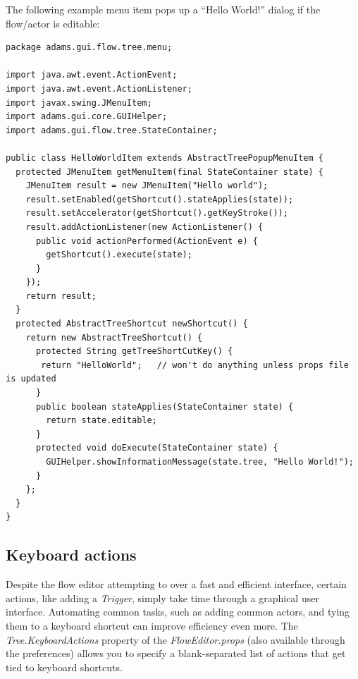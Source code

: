 The following example menu item pops up a ``Hello World!'' dialog if the
flow/actor is editable:
{\scriptsize
\begin{verbatim}
package adams.gui.flow.tree.menu;

import java.awt.event.ActionEvent;
import java.awt.event.ActionListener;
import javax.swing.JMenuItem;
import adams.gui.core.GUIHelper;
import adams.gui.flow.tree.StateContainer;

public class HelloWorldItem extends AbstractTreePopupMenuItem {
  protected JMenuItem getMenuItem(final StateContainer state) {
    JMenuItem result = new JMenuItem("Hello world");
    result.setEnabled(getShortcut().stateApplies(state));
    result.setAccelerator(getShortcut().getKeyStroke());
    result.addActionListener(new ActionListener() {
      public void actionPerformed(ActionEvent e) {
        getShortcut().execute(state);
      }
    });
    return result;
  }
  protected AbstractTreeShortcut newShortcut() {
    return new AbstractTreeShortcut() {
      protected String getTreeShortCutKey() {
 	   return "HelloWorld";   // won't do anything unless props file is updated
      }
      public boolean stateApplies(StateContainer state) {
        return state.editable;
      }
      protected void doExecute(StateContainer state) {
        GUIHelper.showInformationMessage(state.tree, "Hello World!");
      }
    };
  }
}
\end{verbatim}
}

\subsection{Keyboard actions}
\label{floweditor_keyboardactions}
Despite the flow editor attempting to over a fast and efficient interface,
certain actions, like adding a \textit{Trigger}, simply take time through
a graphical user interface. Automating common tasks, such as adding common
actors, and tying them to a keyboard shortcut can improve efficiency even more.
The \textit{Tree.KeyboardActions} property of the \textit{FlowEditor.props}
(also available through the preferences) allows you to specify a blank-separated
list of actions that get tied to keyboard shortcuts.

